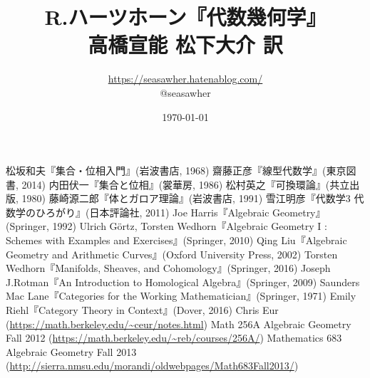 \documentclass[12pt]{jsarticle}%
\begin{document}
\title{R.ハーツホーン『代数幾何学』\\高橋宣能 松下大介 訳}
\author{\url{https://seasawher.hatenablog.com/} \\ @seasawher}
\date{\today}
\maketitle




\newpage



\newpage



\newpage



\newpage



\newpage



\newpage



\newpage






\begin{thebibliography}{1}%
   松坂和夫『集合・位相入門』(岩波書店, 1968)
   齋藤正彦『線型代数学』(東京図書, 2014)
   内田伏一『集合と位相』(裳華房, 1986)
   松村英之『可換環論』(共立出版, 1980)
   藤崎源二郎『体とガロア理論』(岩波書店, 1991)
   雪江明彦『代数学3 代数学のひろがり』(日本評論社, 2011)
   Joe Harris『Algebraic Geometry』(Springer, 1992)
   Ulrich G\"{o}rtz, Torsten Wedhorn『Algebraic Geometry I : Schemes  with Examples and Exercises』(Springer, 2010)
   Qing Liu『Algebraic Geometry and Arithmetic Curves』(Oxford University Press, 2002)
   Torsten Wedhorn『Manifolds, Sheaves, and Cohomology』(Springer, 2016)
   Joseph J.Rotman『An Introduction to Homological Algebra』(Springer, 2009)
   Saunders Mac Lane『Categories for the Working Mathematician』(Springer, 1971)
   Emily Riehl『Category Theory in Context』(Dover, 2016)
   Chris Eur (\url{https://math.berkeley.edu/~ceur/notes.html})
   Math 256A Algebraic Geometry Fall 2012 (\url{https://math.berkeley.edu/~reb/courses/256A/})
   Mathematics 683 Algebraic Geometry Fall 2013 (\url{http://sierra.nmsu.edu/morandi/oldwebpages/Math683Fall2013/})
\end{thebibliography}
\end{document}
